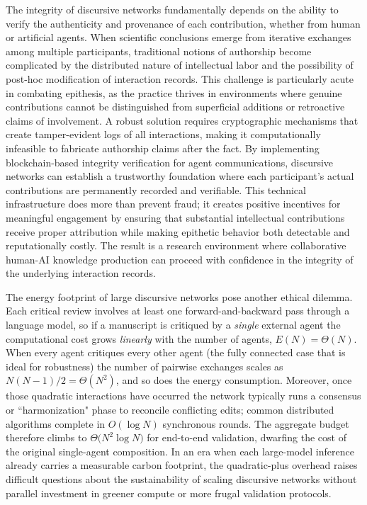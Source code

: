\documentclass[12pt]{article}
\theoremstyle{definition}
\begin{document}
The integrity of discursive networks fundamentally depends on the ability to verify the authenticity and provenance of each contribution, whether from human or artificial agents. When scientific conclusions emerge from iterative exchanges among multiple participants, traditional notions of authorship become complicated by the distributed nature of intellectual labor and the possibility of post-hoc modification of interaction records. This challenge is particularly acute in combating epithesis, as the practice thrives in environments where genuine contributions cannot be distinguished from superficial additions or retroactive claims of involvement. A robust solution requires cryptographic mechanisms that create tamper-evident logs of all interactions, making it computationally infeasible to fabricate authorship claims after the fact. By implementing blockchain-based integrity verification for agent communications, discursive networks can establish a trustworthy foundation where each participant's actual contributions are permanently recorded and verifiable. This technical infrastructure does more than prevent fraud; it creates positive incentives for meaningful engagement by ensuring that substantial intellectual contributions receive proper attribution while making epithetic behavior both detectable and reputationally costly. The result is a research environment where collaborative human-AI knowledge production can proceed with confidence in the integrity of the underlying interaction records.

The energy footprint of large
discursive networks pose another ethical dilemma.  Each critical review involves at least one
forward-and-backward pass through a language model, so if a manuscript is
critiqued by a \emph{single} external agent the computational cost grows
\emph{linearly} with the number of agents, \(E(N)=\Theta(N)\).  When
every agent critiques every other agent (the fully connected case that is
ideal for robustness) the number of pairwise exchanges scales as
\(N(N-1)/2=\Theta(N^{2})\), and so does the energy consumption.
Moreover, once those quadratic interactions have occurred the network
typically runs a consensus or ``harmonization" phase to reconcile
conflicting edits; common distributed algorithms complete in
\(O(\log N)\) synchronous rounds.  The aggregate budget therefore climbs
to \(\Theta \bigl(N^{2}\log N\bigr)\) for end-to-end validation,
dwarfing the cost of the original single-agent composition.  In an era
when each large-model inference already carries a measurable carbon
footprint, the quadratic-plus overhead raises difficult questions about
the sustainability of scaling discursive networks without parallel
investment in greener compute or more frugal validation protocols.
\end{document}
